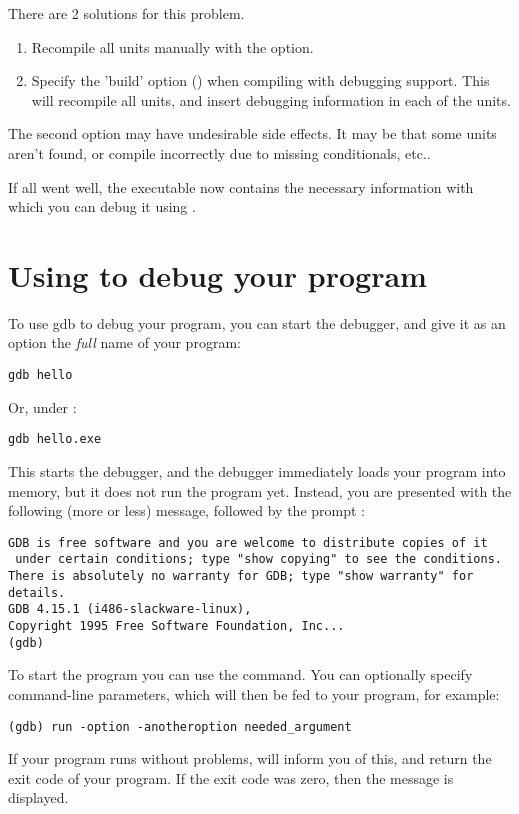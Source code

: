 There are 2 solutions for this problem.
\begin{enumerate}
\item Recompile all units manually with the  option.
\item Specify the 'build' option () when compiling with debugging
support. This will recompile all units, and insert debugging information in
each of the units.
\end{enumerate}
The second option may have undesirable side effects. It may be that some
units aren't found, or compile incorrectly due to missing conditionals,
etc..

If all went well, the executable now contains the necessary information with
which you can debug it using \gnu {}.


\section{Using  to debug your program}
\label{se:usinggdb}

To use gdb to debug your program, you can start the debugger, and give it as
an option the {\em full} name of your program:
\begin{verbatim}
gdb hello
\end{verbatim}
Or, under \dos :
\begin{verbatim}
gdb hello.exe
\end{verbatim}

This starts the debugger, and the debugger immediately loads your program
into memory, but it does not run the program yet. Instead, you are presented
with the following (more or less) message, followed by the  prompt
:
\begin{verbatim}
GDB is free software and you are welcome to distribute copies of it
 under certain conditions; type "show copying" to see the conditions.
There is absolutely no warranty for GDB; type "show warranty" for details.
GDB 4.15.1 (i486-slackware-linux),
Copyright 1995 Free Software Foundation, Inc...
(gdb)
\end{verbatim}
To start the program you can use the  command. You can optionally
specify command-line parameters, which will then be fed to your program, for
example:
\begin{verbatim}
(gdb) run -option -anotheroption needed_argument
\end{verbatim}
If your program runs without problems,  will inform you of this,
and return the exit code of your program. If the exit code was zero, then
the message  is displayed.

